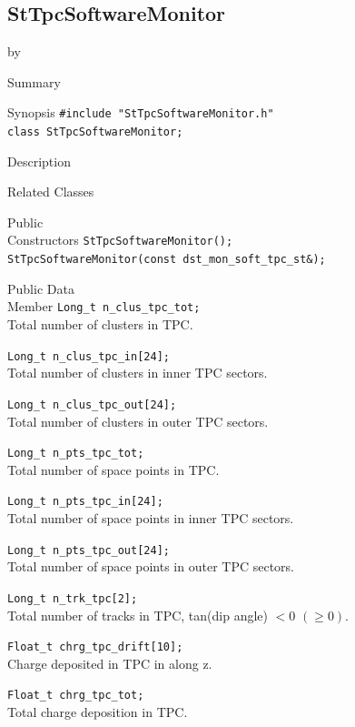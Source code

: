 \documentclass[twoside]{article}
\newcommand{\entrylabel}[1]{\mbox{\textbf{{#1}}}\hfil}%
\newenvironment{entry}
{\begin{list}{}%
    {\renewcommand{\makelabel}{\entrylabel}%
     \setlength{\labelwidth}{90pt}%
     \setlength{\leftmargin}{\labelwidth}
     \advance\leftmargin by \labelsep%
      }%
    }%
  {\end{list}}
\newcommand{\Entrylabel}[1]%
{\raisebox{0pt}[1ex][0pt]{\makebox[\labelwidth][l]%
    {\parbox[t]{\labelwidth}{\hspace{0pt}\textbf{{#1}}}}}}
\newenvironment{Entry}%
{\renewcommand{\entrylabel}{\Entrylabel}\begin{entry}}%
  {\end{entry}}
\begin{document}
\subsection{StTpcSoftwareMonitor}
\label{sec:StTpcSoftwareMonitor}
\begin{Entry}
\item[Summary]
\item[Synopsis]
    \verb+#include "StTpcSoftwareMonitor.h"+\\
    \verb+class StTpcSoftwareMonitor;+\\
\item[Description]
\item[Related Classes]
\item[Public\\ Constructors]
    \verb+StTpcSoftwareMonitor();+\\
    \verb+StTpcSoftwareMonitor(const dst_mon_soft_tpc_st&);+\\
\item[Public Data\\ Member]
    \verb+Long_t n_clus_tpc_tot;+\\
    Total number of clusters in TPC.
    
    \verb+Long_t n_clus_tpc_in[24];+\\
    Total number of clusters in inner TPC sectors.
    
    \verb+Long_t n_clus_tpc_out[24];+\\
    Total number of clusters in outer TPC sectors.
    
    \verb+Long_t n_pts_tpc_tot;+\\
    Total number of space points in TPC.
    
    \verb+Long_t n_pts_tpc_in[24];+\\
    Total number of space points in inner TPC sectors.
    
    \verb+Long_t n_pts_tpc_out[24];+\\
    Total number of space points in outer TPC sectors.
    
    \verb+Long_t n_trk_tpc[2];+\\
    Total number of tracks in TPC, tan(dip angle) $< 0$ $(\ge 0)$.
    
    \verb+Float_t chrg_tpc_drift[10];+\\
    Charge deposited in TPC in along z.
    
    \verb+Float_t chrg_tpc_tot;+\\
    Total charge deposition in TPC.
    

\end{Entry}
\end{document}
